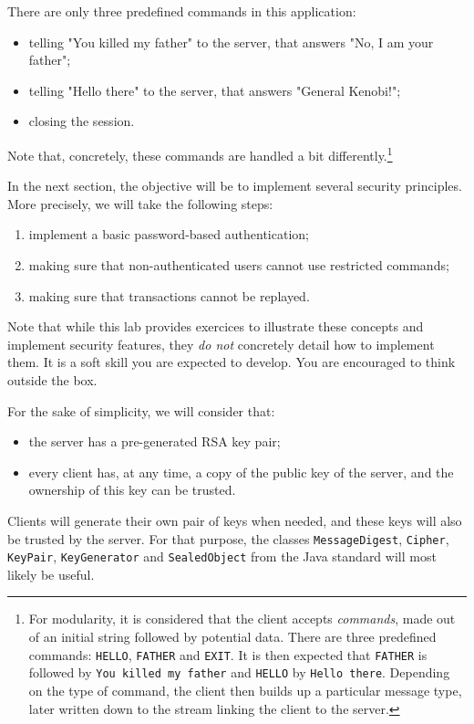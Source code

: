 \documentclass[a4paper,11pt]{article}
\begin{document}
There are only three predefined commands in this application:
\begin{itemize}
\item telling "You killed my father" to the server, that answers "No, I am your father";
\item telling "Hello there" to the server, that answers "General Kenobi!";
\item closing the session.
\end{itemize}
Note that, concretely, these commands are handled a bit differently.\footnote{For modularity, it is considered that the client accepts \emph{commands}, made out of an initial string followed by potential data. There are three predefined commands: \texttt{HELLO}, \texttt{FATHER} and \texttt{EXIT}. It is then expected that \texttt{FATHER} is followed by \texttt{You killed my father} and \texttt{HELLO} by \texttt{Hello there}. Depending on the type of command, the client then builds up a particular message type, later written down to the stream linking the client to the server.}

In the next section, the objective will be to implement several security principles. More precisely, we will take the following steps:
\begin{enumerate}
\item implement a basic password-based authentication;
\item making sure that non-authenticated users cannot use restricted commands;
\item making sure that transactions cannot be replayed.
\end{enumerate}

Note that while this lab provides exercices to illustrate these concepts and implement security features, they \emph{do not} concretely detail how to implement them. It is a soft skill you are expected to develop. You are encouraged to think outside the box.

For the sake of simplicity, we will consider that:
\begin{itemize}
\item the server has a pre-generated RSA key pair;
\item every client has, at any time, a copy of the public key of the server, and the ownership of this key can be trusted.
\end{itemize}
Clients will generate their own pair of keys when needed, and these keys will also be trusted by the server. For that purpose, the classes \texttt{MessageDigest}, \texttt{Cipher}, \texttt{KeyPair}, \texttt{KeyGenerator} and \texttt{SealedObject} from the Java standard will most likely be useful.
\end{document}
